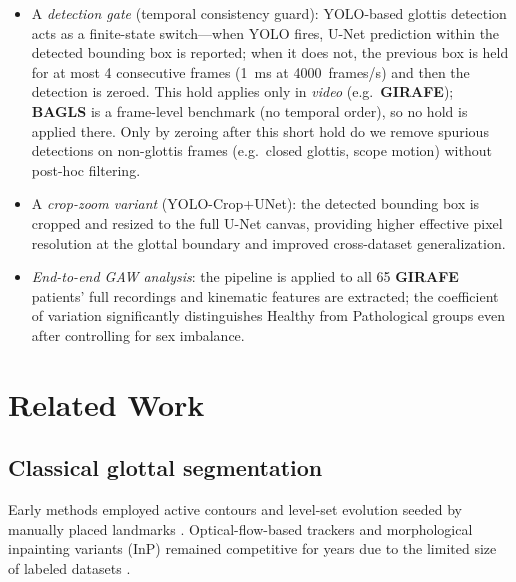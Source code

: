 \documentclass[preprint,12pt]{elsarticle}
\newcommand{\girafe}{\textbf{GIRAFE}}
\newcommand{\bagls}{\textbf{BAGLS}}
\newcommand{\yolocrop}{YOLO-Crop+UNet}
\newcommand{\gaw}{GAW}
\begin{document}
\begin{itemize}
  \item A \emph{detection gate} (temporal consistency guard): YOLO-based
    glottis detection acts as a finite-state switch---when YOLO fires,
    U-Net prediction within the detected bounding box is reported; when it
    does not, the previous box is held for at most \num{4} consecutive
    frames (\SI{1}{ms} at \SI{4000}{frames/s}) and then the detection is zeroed.
    This hold applies only in \emph{video} (e.g.\ \girafe{}); \bagls{} is a
    frame-level benchmark (no temporal order), so no hold is applied there.
    Only by zeroing after this short hold do we remove spurious detections
    on non-glottis frames (e.g.\ closed glottis, scope motion) without
    post-hoc filtering.

  \item A \emph{crop-zoom variant} (\yolocrop{}): the detected bounding box
    is cropped and resized to the full U-Net canvas, providing higher
    effective pixel resolution at the glottal boundary and improved
    cross-dataset generalization.

  \item \emph{End-to-end \gaw{} analysis}: the pipeline is applied to all
    \num{65} \girafe{} patients' full recordings and kinematic features are
    extracted; the coefficient of variation significantly distinguishes
    Healthy from Pathological groups even after controlling for sex
    imbalance.
\end{itemize}

\section{Related Work}
\label{sec:related}

\subsection{Classical glottal segmentation}
Early methods employed active contours and level-set evolution seeded by
manually placed landmarks \cite{lohscheller2008laryngoscope}.
Optical-flow-based trackers and morphological inpainting variants (InP)
remained competitive for years due to the limited size of labeled datasets
\cite{andrade2025datainbrief}.
\end{document}
